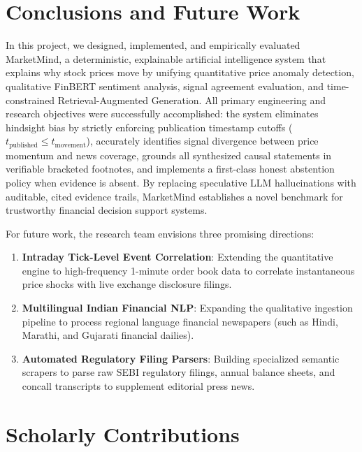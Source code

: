 \documentclass{article}
\begin{document}
	\pagebreak
	\section{Conclusions and Future Work}

	In this project, we designed, implemented, and empirically evaluated MarketMind, a deterministic, explainable artificial intelligence system that explains why stock prices move by unifying quantitative price anomaly detection, qualitative FinBERT sentiment analysis, signal agreement evaluation, and time-constrained Retrieval-Augmented Generation. All primary engineering and research objectives were successfully accomplished: the system eliminates hindsight bias by strictly enforcing publication timestamp cutoffs ($t_{\text{published}} \le t_{\text{movement}}$), accurately identifies signal divergence between price momentum and news coverage, grounds all synthesized causal statements in verifiable bracketed footnotes, and implements a first-class honest abstention policy when evidence is absent. By replacing speculative LLM hallucinations with auditable, cited evidence trails, MarketMind establishes a novel benchmark for trustworthy financial decision support systems.

	For future work, the research team envisions three promising directions:
	\begin{enumerate}
		\item \textbf{Intraday Tick-Level Event Correlation}: Extending the quantitative engine to high-frequency 1-minute order book data to correlate instantaneous price shocks with live exchange disclosure filings.
		\item \textbf{Multilingual Indian Financial NLP}: Expanding the qualitative ingestion pipeline to process regional language financial newspapers (such as Hindi, Marathi, and Gujarati financial dailies).
		\item \textbf{Automated Regulatory Filing Parsers}: Building specialized semantic scrapers to parse raw SEBI regulatory filings, annual balance sheets, and concall transcripts to supplement editorial press news.
	\end{enumerate}

	\pagebreak
	\section{Scholarly Contributions}
\end{document}

